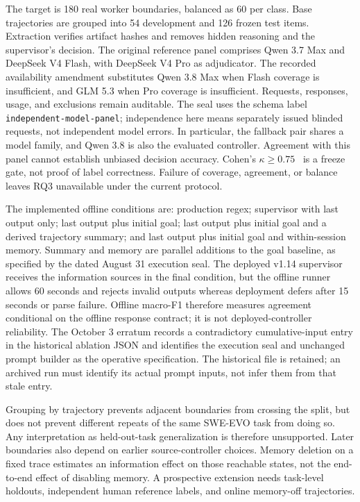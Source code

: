 \documentclass[sigconf,nonacm]{acmart}
\begin{document}
The target is 180 real worker boundaries, balanced as 60 per class. Base trajectories are grouped into 54 development and 126 frozen test items. Extraction verifies artifact hashes and removes hidden reasoning and the supervisor's decision. The original reference panel comprises Qwen 3.7 Max and DeepSeek V4 Flash, with DeepSeek V4 Pro as adjudicator. The recorded availability amendment substitutes Qwen 3.8 Max when Flash coverage is insufficient, and GLM 5.3 when Pro coverage is insufficient. Requests, responses, usage, and exclusions remain auditable. The seal uses the schema label \texttt{independent-model-panel}; independence here means separately issued blinded requests, not independent model errors. In particular, the fallback pair shares a model family, and Qwen 3.8 is also the evaluated controller. Agreement with this panel cannot establish unbiased decision accuracy. Cohen's $\kappa \geq 0.75$~\cite{cohen1960kappa} is a freeze gate, not proof of label correctness. Failure of coverage, agreement, or balance leaves RQ3 unavailable under the current protocol.

The implemented offline conditions are: production regex; supervisor with last output only; last output plus initial goal; last output plus initial goal and a derived trajectory summary; and last output plus initial goal and within-session memory. Summary and memory are parallel additions to the goal baseline, as specified by the dated August 31 execution seal. The deployed v1.14 supervisor receives the information sources in the final condition, but the offline runner allows 60 seconds and rejects invalid outputs whereas deployment defers after 15 seconds or parse failure. Offline macro-F1 therefore measures agreement conditional on the offline response contract; it is not deployed-controller reliability. The October 3 erratum records a contradictory cumulative-input entry in the historical ablation JSON and identifies the execution seal and unchanged prompt builder as the operative specification. The historical file is retained; an archived run must identify its actual prompt inputs, not infer them from that stale entry.

Grouping by trajectory prevents adjacent boundaries from crossing the split, but does not prevent different repeats of the same SWE-EVO task from doing so. Any interpretation as held-out-task generalization is therefore unsupported. Later boundaries also depend on earlier source-controller choices. Memory deletion on a fixed trace estimates an information effect on those reachable states, not the end-to-end effect of disabling memory. A prospective extension needs task-level holdouts, independent human reference labels, and online memory-off trajectories.
\end{document}
